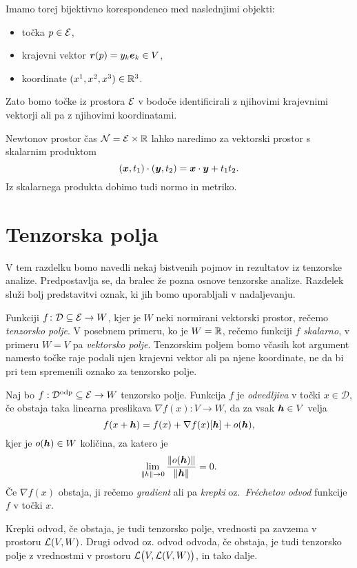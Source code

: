 Imamo torej bijektivno korespondenco med naslednjimi objekti:
\begin{itemize}
	\item točka $p\in\mathcal E$,
	\item krajevni vektor $\boldsymbol r(p)=y_k\boldsymbol e_k\in V$,
	\item koordinate $(x^1,x^2,x^3)\in\mathbb R^3$.
\end{itemize}
Zato bomo točke iz prostora $\mathcal E$ v bodoče identificirali z njihovimi krajevnimi vektorji ali pa z njihovimi koordinatami.

Newtonov prostor čas $\mathcal{N}=\mathcal E\times\mathbb R$ lahko naredimo za vektorski prostor s skalarnim produktom
\[ (\boldsymbol x,t_1)\cdot(\boldsymbol y,t_2) = \boldsymbol x\cdot\boldsymbol y + t_1 t_2. \]
Iz skalarnega produkta dobimo tudi normo in metriko.


\section{Tenzorska polja}


V tem razdelku bomo navedli nekaj bistvenih pojmov in rezultatov iz tenzorske analize. Predpostavlja
se, da bralec že pozna osnove tenzorske analize. Razdelek služi bolj predstavitvi oznak, ki jih
bomo uporabljali v nadaljevanju.

Funkciji $f\colon\mathcal{D}\subseteq\mathcal E\to W$, kjer je $W$ neki normirani vektorski prostor, rečemo
\emph{tenzorsko polje}. V posebnem primeru, ko je $W=\mathbb R$, rečemo funkciji $f$ \emph{skalarno},
v primeru $W=V$ pa \emph{vektorsko polje}. Tenzorskim poljem bomo včasih kot argument namesto točke raje
podali njen krajevni vektor ali pa njene koordinate, ne da bi pri tem spremenili oznako za tenzorsko polje.

\begin{definicija}
	Naj bo $f:\mathcal{D}^{\mathrm{odp}}\subseteq\mathcal E\to W$ tenzorsko polje. Funkcija $f$ je \emph{odvedljiva}
	v točki $x\in\mathcal{D}$, če obstaja taka linearna preslikava $\nabla f(x):V\to W$, da za vsak $\boldsymbol h\in V$ velja
	\begin{equation*}
		f(x+\boldsymbol h)=f(x)+\nabla f(x)[\boldsymbol h]+o(\boldsymbol h),
	\end{equation*}
	kjer je $o(\boldsymbol h)\in W$ količina, za katero je
	\[ \lim_{\| h\|\to 0}\frac{\|o(\boldsymbol h)\|}{\|\boldsymbol h\|}=0. \]
	Če $\nabla f(x)$ obstaja, ji rečemo \emph{gradient} ali pa \emph{krepki} oz.~\emph{Fréchetov odvod} funkcije $f$ v točki $x$.
\end{definicija}
Krepki odvod, če obstaja, je tudi tenzorsko polje, vrednosti pa zavzema v prostoru $\mathcal L(V,W)$.
Drugi odvod oz. odvod odvoda, če obstaja, je tudi tenzorsko polje z vrednostmi v prostoru $\mathcal L\big(V,\mathcal L(V,W)\big)$,
in tako dalje.

